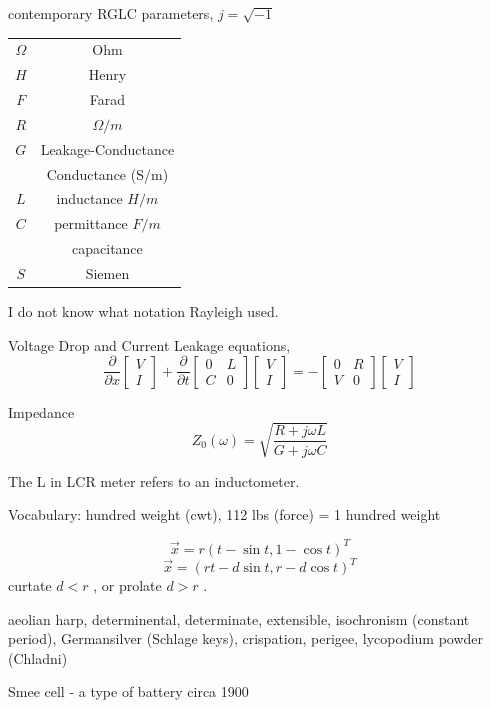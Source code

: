 contemporary RGLC parameters,  \( j = \sqrt{-1} \)

\begin{tabular}{cc}
\(\Omega \) & Ohm \\
\(H\) &  Henry  \\
\(F\) &  Farad  \\
\(R\) & \(\Omega/m\)  \\
\(G\) &  Leakage-Conductance \\
 &  Conductance (S/m) \\
\(L\) &  inductance \(H/m\) \\
\(C\) & permittance \(F/m\) \\
 & capacitance  \\
\(S\) & Siemen \\
\end{tabular}

I do not know what notation Rayleigh used.

Voltage Drop and Current Leakage equations,
\[
\frac{\partial}{\partial x}
\begin{bmatrix} V \\ I \end{bmatrix}
+
\frac{\partial}{\partial t}
\begin{bmatrix}
0 & L \\
C & 0
\end{bmatrix}
\begin{bmatrix} V \\ I \end{bmatrix} = -
\begin{bmatrix}
0 & R \\
V & 0
\end{bmatrix}
\begin{bmatrix} V \\ I \end{bmatrix}
\]

Impedance
\[
Z_{0}(\omega) =\sqrt{\frac{R+j\omega L}{G+j\omega C}}
\]

The L in LCR meter refers to an inductometer.

Vocabulary:
hundred weight (cwt), 112 lbs (force) =  1 hundred weight

\[\vec{x} = r( t - \sin t, 1 - \cos t)^T \tag{cycloid} \]
\[\vec{x} = ( r t - d \sin t, r - d \cos t)^T \tag{trochoid} \]
curtate \(d < r \) , or prolate \(d > r \) .

aeolian harp, determinental, determinate, extensible, isochronism (constant period),
Germansilver (Schlage keys), crispation, perigee, lycopodium powder (Chladni)

Smee cell  - a type of battery  circa 1900
